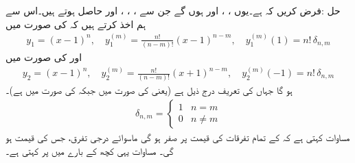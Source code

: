 حل :فرض کریں کہ  ہے۔یوں ، ،  اور  ہوں گے جن  سے ، ، ،  اور  حاصل ہوتے ہیں۔اس سے ہم اخذ کرتے ہیں کہ  کی صورت میں
\begin{align}\label{مساوات_بیسل_سوال_عمومی_الف}
y_1=(x-1)^n,\quad y_1^{(m)}=\frac{n!}{(n-m)!}(x-1)^{n-m},\quad y_1^{(m)}(1)=n! \,\delta_{n,m}
\end{align}
اور  کی صورت میں
\begin{align}\label{مساوات_بیسل_سوال_عمومی_ب}
y_2=(x-1)^n,\quad y_2^{(m)}=\frac{n!}{(n-m)!}(x+1)^{n-m},\quad y_2^{(m)}(-1)=n! \,\delta_{n,m}
\end{align}
ہو گا جہاں  کی تعریف درج ذیل ہے (یعنی  کی صورت میں  جبکہ  کی صورت میں  ہے)۔ 
\begin{align}\label{مساوات_بیسل_کرونیکر_الف}
\delta_{n,m}=
\begin{cases}
1& n=m\\
0&n \ne m
\end{cases}
\end{align}
مساوات  کہتی ہے کہ  کے تمام تفرقات کی قیمت  پر صفر ہو گی ماسوائے  درجی تفرق، جس کی قیمت  ہو گی۔  مساوات  یہی کچھ  کے بارے میں  پر کہتی ہے۔

